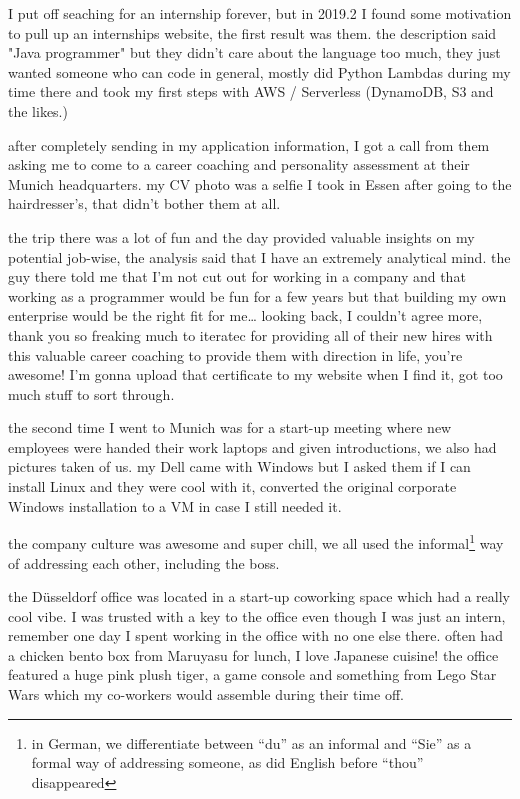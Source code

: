 \documentclass[12pt]{report}
\theoremstyle{definition}
\theoremstyle{remark}
\begin{document}
I put off seaching for an internship forever, but in 2019.2 I found some motivation to pull up an internships website, the first result was them. the description said "Java programmer" but they didn't care about the language too much, they just wanted someone who can code in general, mostly did Python Lambdas during my time there and took my first steps with AWS / Serverless (DynamoDB, S3 and the likes.)

after completely sending in my application information, I got a call from them asking me to come to a career coaching and personality assessment at their Munich headquarters. my CV photo was a selfie I took in Essen after going to the hairdresser's, that didn't bother them at all.

the trip there was a lot of fun and the day provided valuable insights on my potential job-wise, the analysis said that I have an extremely analytical mind. the guy there told me that I'm not cut out for working in a company and that working as a programmer would be fun for a few years but that building my own enterprise would be the right fit for me… looking back, I couldn't agree more, thank you so freaking much to iteratec for providing all of their new hires with this valuable career coaching to provide them with direction in life, you're awesome! I'm gonna upload that certificate to my website when I find it, got too much stuff to sort through.

the second time I went to Munich was for a start-up meeting where new employees were handed their work laptops and given introductions, we also had pictures taken of us. my Dell came with Windows but I asked them if I can install Linux and they were cool with it, converted the original corporate Windows installation to a VM in case I still needed it.

the company culture was awesome and super chill, we all used the informal\footnote{in German, we differentiate between ``du'' as an informal and ``Sie'' as a formal way of addressing someone, as did English before ``thou'' disappeared} way of addressing each other, including the boss.

the Düsseldorf office was located in a start-up coworking space which had a really cool vibe. I was trusted with a key to the office even though I was just an intern, remember one day I spent working in the office with no one else there. often had a chicken bento box from Maruyasu for lunch, I love Japanese cuisine! the office featured a huge pink plush tiger, a game console and something from Lego Star Wars which my co-workers would assemble during their time off.
\end{document}
